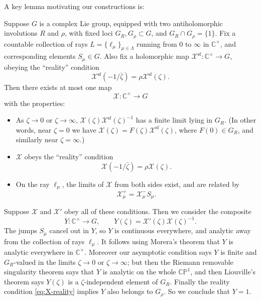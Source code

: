 \documentclass[12pt,letterpaper,reqno]{article}
\numberwithin{equation}{section}
\newcommand{\cX}{\ensuremath{\mathcal X}}
\newcommand{\C}{\ensuremath{\mathbb C}}
\newcommand{\PP}{\ensuremath{\mathbb P}}
\renewcommand{\sf}{\mathrm{sf}}
\newcommand{\fixme}[1]{{\color{orange}{[#1]}}}
\begin{document}
\fixme{motivation for this picture from Stokes phenomena of
irregular ODE}


A key lemma motivating our constructions is:

\begin{lem} \label{lem:rh-uniqueness}
Suppose $G$ is a complex Lie group, equipped with two antiholomorphic
involutions $R$ and $\rho$, with fixed loci $G_R, G_\rho \subset G$,
and $G_R \cap G_\rho = \{1\}$.
Fix a countable collection of rays $L = \{\ell_\mu\}_{\mu \in \Lambda}$
running from $0$ to $\infty$ in $\C^\times$,
and corresponding elements $S_\mu \in G$.
Also fix a holomorphic map $\cX^\sf: \C^\times \to G$,
obeying the ``reality'' condition
\begin{equation} \label{eq:Xsf-reality}
  \cX^\sf(-1/\bar\zeta) = \rho \cX^\sf(\zeta).
\end{equation}
Then there exists at most one map
$$ \cX: \C^\times \to G $$
with the properties:
\begin{itemize}
\item As $\zeta \to 0$ or $\zeta \to \infty$, $\cX(\zeta) \cX^\sf(\zeta)^{-1}$ has a finite limit lying in $G_R$.
(In other words, near $\zeta = 0$ we have $\cX(\zeta) = F(\zeta) \cX^\sf(\zeta)$, where $F(0) \in G_R$, and similarly near $\zeta = \infty$.)
\item $\cX$ obeys the ``reality'' condition
\begin{equation} \label{eq:X-reality}
  \cX(-1/\bar\zeta) = \rho \cX(\zeta).
\end{equation}
\item On the ray $\ell_\mu$, the limits of $\cX$ from both sides
exist, and are related by
\begin{equation}
  \cX^+_\mu = \cX^-_\mu S_\mu.
\end{equation}
\end{itemize}

\end{lem}

\begin{pf} Suppose $\cX$ and $\cX'$ obey all of these conditions.
Then we consider the composite
\begin{equation}
  Y: \C^\times \to G, \qquad Y(\zeta) = \cX'(\zeta)\cX(\zeta)^{-1}.
\end{equation}
The jumps $S_\mu$ cancel out in $Y$, so $Y$ is continuous
everywhere, and analytic away from the collection of rays $\ell_\mu$.
It follows using Morera's theorem that $Y$ is analytic
everywhere in $\C^\times$. \fixme{even if the $\ell_\mu$ are dense?}
Moreover our asymptotic condition says $Y$ is finite
and $G_R$-valued in the limits
$\zeta \to 0$ or $\zeta \to \infty$; but then the Riemann removable
singularity theorem says that $Y$ is analytic on the whole
$\C\PP^1$, and then Liouville's theorem says
$Y(\zeta)$ is a $\zeta$-independent element of $G_R$. Finally
the reality condition \eqref{eq:X-reality} implies $Y$
also belongs to $G_\rho$. So we conclude that $Y = 1$.
\end{pf}
\end{document}
